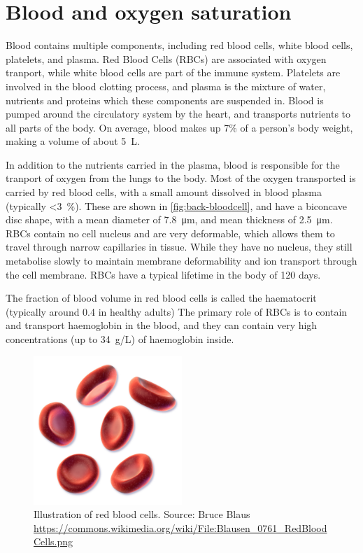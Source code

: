 \section{Blood and oxygen saturation}

Blood contains multiple components, including red blood cells, white blood cells, platelets, and plasma.
Red Blood Cells (RBCs) are associated with oxygen tranport, while white blood cells are part of the immune system.
Platelets are involved in the blood clotting process, and plasma is the mixture of water, nutrients and proteins which these components are suspended in.
Blood is pumped around the circulatory system by the heart, and transports nutrients to all parts of the body.
On average, blood makes up 7\% of a person's body weight, making a volume of about \SI{5}{L}.

In addition to the nutrients carried in the plasma,  blood is responsible for the tranport of oxygen from the lungs to the body.
Most of the oxygen transported is carried by red blood cells, with a small amount dissolved in blood plasma (typically \SI{<3}{\percent}).
These are shown in \autoref{fig:back-bloodcell}, and have a biconcave disc shape, with a mean diameter of \SI{7.8}{\micro\metre}, and mean thickness of \SI{2.5}{\micro\metre}.
RBCs contain no cell nucleus and are very deformable, which allows them to travel through narrow capillaries in tissue.
While they have no nucleus, they still metabolise slowly to maintain membrane deformability and ion transport through the cell membrane.
RBCs have a typical lifetime in the body of 120 days.

The fraction of blood volume in red blood cells is called the haematocrit (typically around 0.4 in healthy adults)
The primary role of RBCs is to contain and transport haemoglobin in the blood, and they can contain very high concentrations (up to \SI{34}{g/L}) of haemoglobin inside.

\begin{figure}[t]
\centering
\includegraphics[width=0.5\textwidth]{figures/background/Blausen_0761_RedBloodCells_crop.png}
\caption[Illustration of red blood cells]{Illustration of red blood cells. Source: Bruce Blaus \url{https://commons.wikimedia.org/wiki/File:Blausen_0761_RedBloodCells.png}}
\label{fig:back-bloodcell}
\end{figure}


